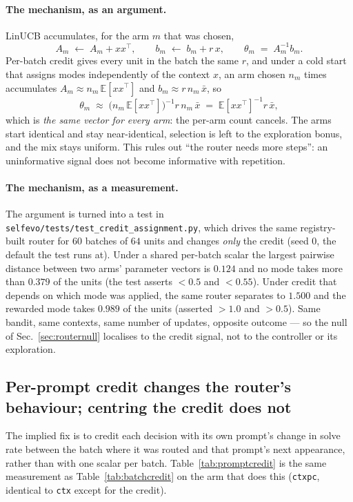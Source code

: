 \paragraph{The mechanism, as an argument.} LinUCB accumulates, for the arm $m$ that was
chosen,
%
\[
  A_m \;\leftarrow\; A_m + x x^\top,
  \qquad
  b_m \;\leftarrow\; b_m + r\,x ,
  \qquad
  \theta_m \;=\; A_m^{-1} b_m .
\]
%
Per-batch credit gives every unit in the batch the same $r$, and under a cold start that
assigns modes independently of the context $x$, an arm chosen $n_m$ times accumulates
$A_m \approx n_m\,\mathbb{E}[x x^\top]$ and $b_m \approx r\,n_m\,\bar x$, so
%
\[
  \theta_m \;\approx\; \bigl(n_m\,\mathbb{E}[x x^\top]\bigr)^{-1} r\,n_m\,\bar x
           \;=\; \mathbb{E}[x x^\top]^{-1} r\,\bar x ,
\]
%
which is \emph{the same vector for every arm}: the per-arm count cancels. The arms start
identical and stay near-identical, selection is left to the exploration bonus, and the mix
stays uniform. This rules out ``the router needs more steps'': an uninformative signal does
not become informative with repetition.

\paragraph{The mechanism, as a measurement.} The argument is turned into a test in
\texttt{selfevo/tests/test\_credit\_assignment.py}, which drives the same registry-built
router for $60$ batches of $64$ units and changes \emph{only} the credit (seed $0$, the
default the test runs at). Under a shared
per-batch scalar the largest pairwise distance between two arms' parameter vectors is $0.124$
and no mode takes more than $0.379$ of the units (the test asserts $<0.5$ and $<0.55$). Under
credit that depends on which mode was applied, the same router separates to $1.500$ and the
rewarded mode takes $0.989$ of the units (asserted $>1.0$ and $>0.5$). Same bandit, same
contexts, same number of updates, opposite outcome --- so the null of
Sec.~\ref{sec:routernull} localises to the credit signal, not to the controller or its
exploration.

\subsection{Per-prompt credit changes the router's behaviour; centring the credit does not}
\label{sec:promptcredit}

The implied fix is to credit each decision with its own prompt's change in solve rate between
the batch where it was routed and that prompt's next appearance, rather than with one scalar
per batch. Table~\ref{tab:promptcredit} is the same measurement as
Table~\ref{tab:batchcredit} on the arm that does this (\texttt{ctxpc}, identical to
\texttt{ctx} except for the credit).

